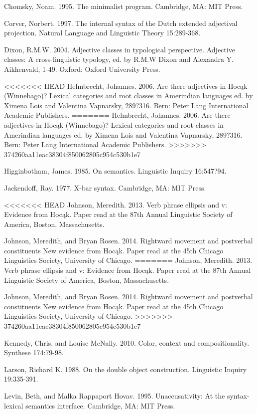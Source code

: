 \documentclass[output=paper]{LSP/langsci}
\begin{document}
\begin{exe}
\begin{exe}
\begin{exe}
\begin{exe}
{\begin{exe}
\begin{reflist}
Chomsky, Noam. 1995. The minimalist program. Cambridge, MA: MIT Press.

Corver, Norbert. 1997. The internal syntax of the Dutch extended adjectival projection. Natural Language and Linguistic Theory 15:289-368.

Dixon, R.M.W. 2004. Adjective classes in typological perspective. Adjective classes: A cross-linguistic typology, ed. by R.M.W Dixon and Alexandra Y. Aikhenvald, 1-49. Oxford: Oxford University Press.

<<<<<<< HEAD
Helmbrecht, Johannes. 2006. Are there adjectives in Hocąk (Winnebago)? Lexical categories and root classes in Amerindian languages ed. by Ximena Lois and Valentina Vapnarsky, 289?316. Bern: Peter Lang International Academic Publishers.
=======
Helmbrecht, Johannes. 2006. Are there adjectives in Hoc\k{a}k (Winnebago)? Lexical categories and root classes in Amerindian languages ed. by Ximena Lois and Valentina Vapnarsky, 289?316. Bern: Peter Lang International Academic Publishers.
>>>>>>> 374260aa11eac38304f850062805c954c530b1e7

Higginbotham, James. 1985. On semantics. Linguistic Inquiry 16:547?94.

Jackendoff, Ray. 1977. X-bar syntax. Cambridge, MA: MIT Press.

<<<<<<< HEAD
Johnson, Meredith. 2013. Verb phrase ellipsis and v: Evidence from Hocąk. Paper read at the 87th Annual Linguistic Society of America, Boston, Massachusetts.

Johnson, Meredith, and Bryan Rosen. 2014. Rightward movement and postverbal constituents New evidence from Hocąk. Paper read at the 45th Chicago Linguistics Society, University of Chicago.
=======
Johnson, Meredith. 2013. Verb phrase ellipsis and v: Evidence from Hoc\k{a}k. Paper read at the 87th Annual Linguistic Society of America, Boston, Massachusetts.

Johnson, Meredith, and Bryan Rosen. 2014. Rightward movement and postverbal constituents New evidence from Hoc\k{a}k. Paper read at the 45th Chicago Linguistics Society, University of Chicago.
>>>>>>> 374260aa11eac38304f850062805c954c530b1e7

Kennedy, Chris, and Louise McNally. 2010. Color, context and compositionality. Synthese 174:79-98.

Larson, Richard K. 1988. On the double object construction. Linguistic Inquiry 19:335-391.

Levin, Beth, and Malka Rappaport Hovav. 1995. Unaccusativity: At the syntax-lexical semantics interface. Cambridge, MA: MIT Press.


\end{reflist}
\end{exe}}
\end{exe}
\end{exe}
\end{exe}
\end{exe}
\end{document}
